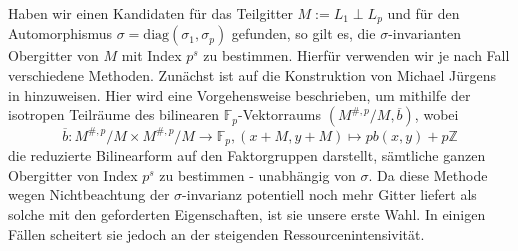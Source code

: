 \documentclass[12pt,a4paper,halfparskip,headsepline,bibtotocnumbered]{scrreprt}
\theoremstyle{nummermitklammern}
\theoremstyle{nonumberbreak}
\newcommand{\Z}{\mathbb{Z}}
\newcommand{\F}{\mathbb{F}}
\begin{document}
Haben wir einen Kandidaten für das Teilgitter $M := L_1 \perp L_p$ und für den Automorphismus $\sigma = \text{diag}(\sigma_1, \sigma_p)$ gefunden, so gilt es, die $\sigma$-invarianten Obergitter von $M$ mit Index $p^s$ zu bestimmen. Hierfür verwenden wir je nach Fall verschiedene Methoden. Zunächst ist auf die Konstruktion von Michael Jürgens in \cite[Abschnitt (1.4)]{juergens} hinzuweisen. Hier wird eine Vorgehensweise beschrieben, um mithilfe der isotropen Teilräume des bilinearen $\F_p$-Vektorraums $(M^{\#,p} / M, \overline{b})$, wobei
\begin{equation*}
	\overline{b} : M^{\#,p} / M \times M^{\#,p} / M \rightarrow \F_p, (x+M,y+M) \mapsto pb(x,y) + p\Z
\end{equation*}
die reduzierte Bilinearform auf den Faktorgruppen darstellt, sämtliche ganzen Obergitter von Index $p^s$ zu bestimmen - unabhängig von $\sigma$. Da diese Methode wegen Nichtbeachtung der $\sigma$-invarianz potentiell noch mehr Gitter liefert als solche mit den geforderten Eigenschaften, ist sie unsere erste Wahl. In einigen Fällen scheitert sie jedoch an der steigenden Ressourcenintensivität.\par
\end{document}
